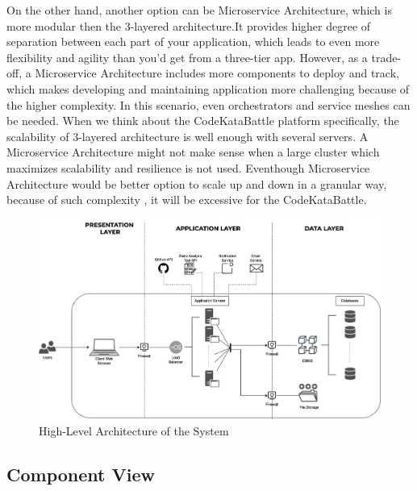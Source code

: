 \indent On the other hand, another option can be Microservice Architecture, which is more modular then the 3-layered architecture.It provides higher degree of separation between each part of your application, which leads to even more flexibility and agility than you'd get from a three-tier app. However, as a trade-off, a Microservice Architecture includes more components to deploy and track, which makes developing and maintaining application more challenging because of the higher complexity. In this scenario, even orchestrators and service meshes can be needed. When we think about the CodeKataBattle platform specifically, the scalability of 3-layered architecture is well enough with several servers. A Microservice Architecture might not make sense when a large cluster which maximizes scalability and resilience is not used. Eventhough Microservice Architecture would be better option to scale up and down in a granular way, because of such complexity , it will be excessive for the CodeKataBattle. \\

\begin{figure}[H]
    \centering
    \includegraphics[scale=0.25]{Images/hl-architecture.drawio.png}
    \caption{High-Level Architecture of the System}
\end{figure}

\newpage 
\subsection{Component View}

